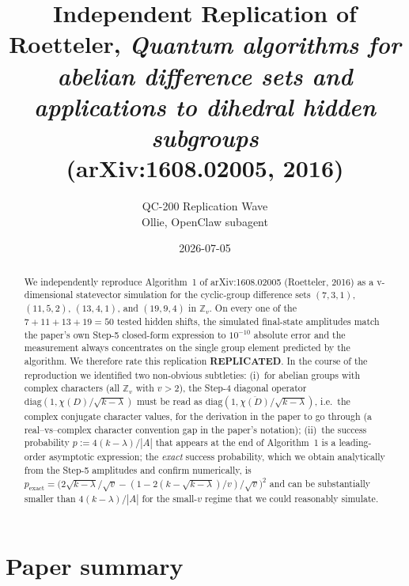 \documentclass[11pt]{article}
\title{Independent Replication of \\
       Roetteler, \emph{Quantum algorithms for abelian difference sets and
       applications to dihedral hidden subgroups} \\
       (arXiv:1608.02005, 2016)}
\author{QC-200 Replication Wave \\ Ollie, OpenClaw subagent}
\date{2026-07-05}
\begin{document}
\maketitle

\begin{abstract}
We independently reproduce Algorithm~1 of arXiv:1608.02005 (Roetteler, 2016)
as a v-dimensional statevector simulation for the cyclic-group difference
sets $(7,3,1)$, $(11,5,2)$, $(13,4,1)$, and $(19,9,4)$ in
$\mathbb{Z}_v$.  On every one of the $7+11+13+19 = 50$ tested hidden shifts,
the simulated final-state amplitudes match the paper's own Step-5 closed-form
expression to $10^{-10}$ absolute error and the measurement always
concentrates on the single group element predicted by the algorithm.  We
therefore rate this replication \textbf{REPLICATED}.  In the course of the
reproduction we identified two non-obvious subtleties: (i)~for abelian groups
with complex characters (all $\mathbb{Z}_v$ with $v>2$), the Step-4 diagonal
operator $\mathrm{diag}(1,\chi(D)/\sqrt{k-\lambda})$ must be read as
$\mathrm{diag}(1,\overline{\chi(D)}/\sqrt{k-\lambda})$, i.e.\ the complex
conjugate character values, for the derivation in the paper to go through
(a real--vs--complex character convention gap in the paper's notation);
(ii)~the success probability $p := 4(k-\lambda)/|A|$ that appears at the end
of Algorithm~1 is a leading-order asymptotic expression; the \emph{exact}
success probability, which we obtain analytically from the Step-5 amplitudes
and confirm numerically, is
$p_{\text{exact}} = \bigl(2\sqrt{k-\lambda}/\sqrt v -
     (1-2(k-\sqrt{k-\lambda})/v)/\sqrt v\bigr)^2$
and can be substantially smaller than $4(k-\lambda)/|A|$ for the
small-$v$ regime that we could reasonably simulate.
\end{abstract}

\section{Paper summary}
\end{document}
